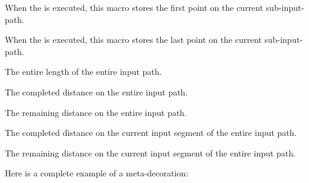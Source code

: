 \begin{command}{\pgfdeclaremetadecorate{}}
\begin{command}{\state{}}
    \begin{command}{\pgfpointmetadecoratedpathfirst}
      When the  is executed,
      this macro stores the first point on the current
      sub-input-path. 
    \end{command}

    \begin{command}{\pgfpointmetadecoratedpathlast}
      When the  is executed,
      this macro stores the last point on the current
      sub-input-path. 
    \end{command}
    
    \begin{command}{\pgfmetadecoratedpathlength}
      The entire length of the entire input path.
    \end{command}    
    
    \begin{command}{\pgfmetadecoratedcompleteddistance}
      The completed distance on the entire input path.
    \end{command}
    
    \begin{command}{\pgfmetadecoratedremainingdistance}
      The remaining distance on the entire input path.
    \end{command}
    
    \begin{command}{\pgfmetadecoratedinputsegmentcompleteddistance}
      The completed distance on the current input segment of the entire
      input path.
    \end{command}
    
    \begin{command}{\pgfmetadecoratedinputsegmentremainingdistance}
      The remaining distance on the current input segment of the entire
      input path.
    \end{command}
  \end{command}

  Here is a complete example of a meta-decoration:


\end{command}
